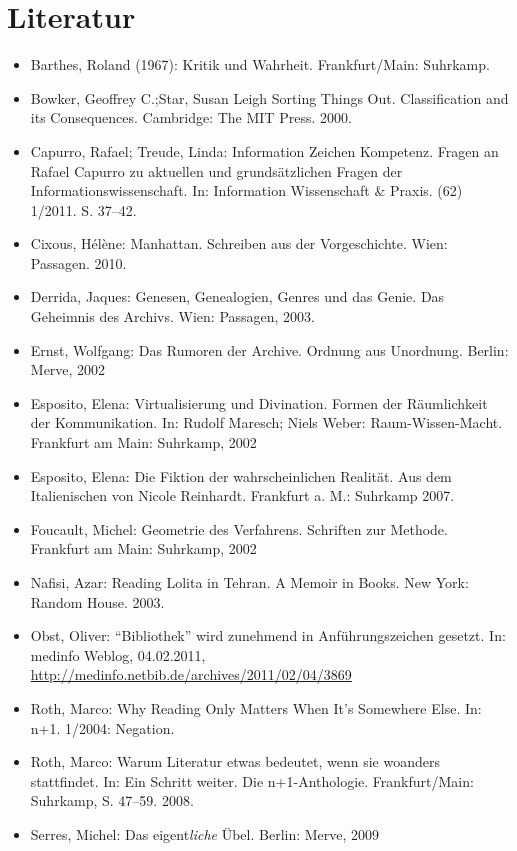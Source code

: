 \documentclass[output=paper]{langscibook}
\begin{document}
\hypertarget{literatur}{%
\section*{Literatur}\label{literatur}}
\begin{itemize}
\item Barthes, Roland (1967): Kritik und Wahrheit. Frankfurt/Main: Suhrkamp.

\item Bowker, Geoffrey C.;Star, Susan Leigh Sorting Things Out. Classification
and its Consequences. Cambridge: The MIT Press. 2000.

\item Capurro, Rafael; Treude, Linda: Information Zeichen Kompetenz. Fragen an
Rafael Capurro zu aktuellen und grundsätzlichen Fragen der
Informationswissenschaft. In: Information Wissenschaft \& Praxis. (62)
1/2011. S. 37--42.

\item Cixous, Hélène: Manhattan. Schreiben aus der Vorgeschichte. Wien:
Passagen. 2010.

\item Derrida, Jaques: Genesen, Genealogien, Genres und das Genie. Das
Geheimnis des Archivs. Wien: Passagen, 2003.

\item Ernst, Wolfgang: Das Rumoren der Archive. Ordnung aus Unordnung. Berlin:
Merve, 2002

\item Esposito, Elena: Virtualisierung und Divination. Formen der Räumlichkeit
der Kommunikation. In: Rudolf Maresch; Niels Weber: Raum-Wissen-Macht.
Frankfurt am Main: Suhrkamp, 2002

\item Esposito, Elena: Die Fiktion der wahrscheinlichen Realität. Aus dem
Italienischen von Nicole Reinhardt. Frankfurt a. M.: Suhrkamp 2007.

\item Foucault, Michel: Geometrie des Verfahrens. Schriften zur Methode.
Frankfurt am Main: Suhrkamp, 2002

\item Nafisi, Azar: Reading Lolita in Tehran. A Memoir in Books. New York:
Random House. 2003.

\item Obst, Oliver: \enquote{Bibliothek} wird zunehmend in Anführungszeichen
gesetzt. In: medinfo Weblog, 04.02.2011,
\url{http://medinfo.netbib.de/archives/2011/02/04/3869}

\item Roth, Marco: Why Reading Only Matters When It's Somewhere Else. In: n+1.
1/2004: Negation.

\item Roth, Marco: Warum Literatur etwas bedeutet, wenn sie woanders
stattfindet. In: Ein Schritt weiter. Die n+1-Anthologie. Frankfurt/Main:
Suhrkamp, S. 47--59. 2008.

\item Serres, Michel: Das eigent\emph{liche} Übel. Berlin: Merve, 2009
\end{itemize}
\end{document}
